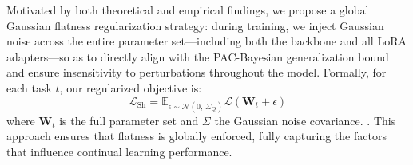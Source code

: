 \documentclass[letterpaper]{article} %
\begin{document}
Motivated by both theoretical and empirical findings, we propose a global Gaussian flatness regularization strategy: during training, we inject Gaussian noise across the entire parameter set—including both the backbone and all LoRA adapters—so as to directly align with the PAC-Bayesian generalization bound and ensure insensitivity to perturbations throughout the model.  Formally, for each task $t$, our regularized objective is:
\begin{equation}
    \mathcal{L}_{\text{Sh}} = \mathbb{E}_{\epsilon \sim \mathcal{N}(0,\,\Sigma_Q)}\mathcal{L}({\mathbf{W}_t+\epsilon}) 
\end{equation}
where $\mathbf{W}_t$ is the full parameter set and $\Sigma$ the Gaussian noise covariance. . This approach ensures that flatness is globally enforced, fully capturing the factors that influence continual learning performance.

















\end{document}
